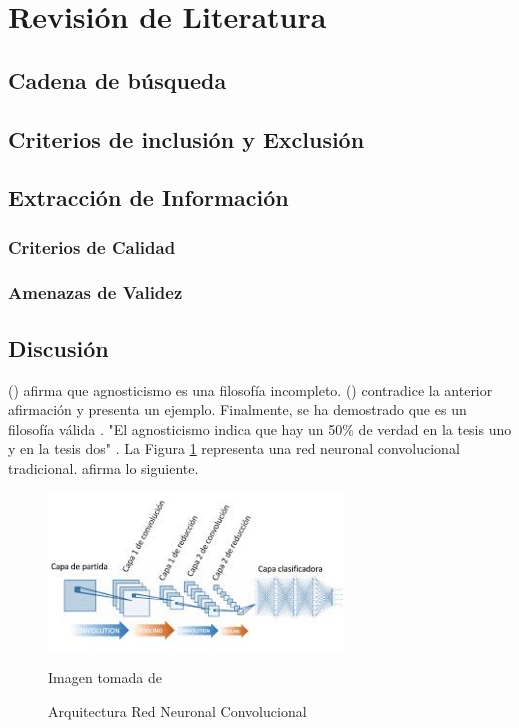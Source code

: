 \section{Revisión de Literatura}
\subsection{Cadena de búsqueda}
\lipsum[1-4]
\subsection{Criterios de inclusión y Exclusión}
\lipsum[1-4]
\subsection{Extracción de Información}
\subsubsection{Criterios de Calidad}
\lipsum[1-4]
\subsubsection{Amenazas de Validez}
\lipsum[1-4]
\subsection{Discusión}
\citeauthor{dawkins_biology_2016} (\citeyear{dawkins_biology_2016}) afirma que agnosticismo es una filosofía incompleto. \citeauthor{nogueira2017image} (\citeyear{nogueira2017image}) contradice la anterior afirmación y presenta un ejemplo. Finalmente, se ha demostrado que es un filosofía válida \parencite[ver pag 92]{priandana2018backprop}. "El agnosticismo indica que hay un 50\% de verdad en la tesis uno y en la tesis dos" \textcite{nogueira2017image}. La Figura \ref{fig:arquitecturaRedConv} representa una red neuronal convolucional tradicional. \textcite{saha2018} afirma lo siguiente.

\begin{figure}[h!]
    \centering
    \includegraphics[width=0.7\textwidth]{imagenes/convnet.jpeg}
    \caption{Arquitectura Red Neuronal Convolucional}
    \footnotesize{Imagen tomada de \textcite[Capítulo 1, pág. 23]{nogueira2017image}}
    \label{fig:arquitecturaRedConv}
\end{figure}

